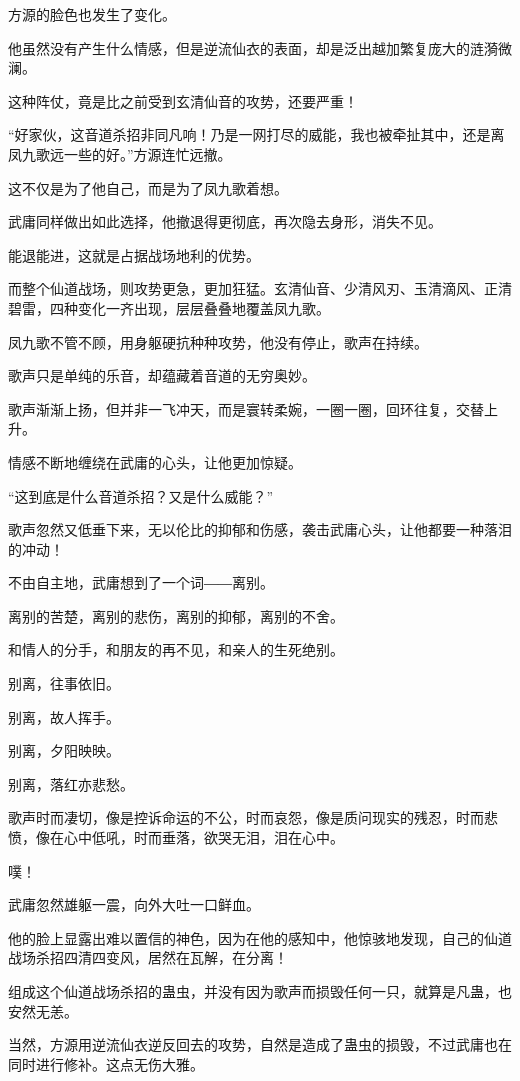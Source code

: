 \begin{this_body}
方源的脸色也发生了变化。

他虽然没有产生什么情感，但是逆流仙衣的表面，却是泛出越加繁复庞大的涟漪微澜。

这种阵仗，竟是比之前受到玄清仙音的攻势，还要严重！

“好家伙，这音道杀招非同凡响！乃是一网打尽的威能，我也被牵扯其中，还是离凤九歌远一些的好。”方源连忙远撤。

这不仅是为了他自己，而是为了凤九歌着想。

武庸同样做出如此选择，他撤退得更彻底，再次隐去身形，消失不见。

能退能进，这就是占据战场地利的优势。

而整个仙道战场，则攻势更急，更加狂猛。玄清仙音、少清风刃、玉清滴风、正清碧雷，四种变化一齐出现，层层叠叠地覆盖凤九歌。

凤九歌不管不顾，用身躯硬抗种种攻势，他没有停止，歌声在持续。

歌声只是单纯的乐音，却蕴藏着音道的无穷奥妙。

歌声渐渐上扬，但并非一飞冲天，而是寰转柔婉，一圈一圈，回环往复，交替上升。

情感不断地缠绕在武庸的心头，让他更加惊疑。

“这到底是什么音道杀招？又是什么威能？”

歌声忽然又低垂下来，无以伦比的抑郁和伤感，袭击武庸心头，让他都要一种落泪的冲动！

不由自主地，武庸想到了一个词――离别。

离别的苦楚，离别的悲伤，离别的抑郁，离别的不舍。

和情人的分手，和朋友的再不见，和亲人的生死绝别。

别离，往事依旧。

别离，故人挥手。

别离，夕阳映映。

别离，落红亦悲愁。

歌声时而凄切，像是控诉命运的不公，时而哀怨，像是质问现实的残忍，时而悲愤，像在心中低吼，时而垂落，欲哭无泪，泪在心中。

噗！

武庸忽然雄躯一震，向外大吐一口鲜血。

他的脸上显露出难以置信的神色，因为在他的感知中，他惊骇地发现，自己的仙道战场杀招四清四变风，居然在瓦解，在分离！

组成这个仙道战场杀招的蛊虫，并没有因为歌声而损毁任何一只，就算是凡蛊，也安然无恙。

当然，方源用逆流仙衣逆反回去的攻势，自然是造成了蛊虫的损毁，不过武庸也在同时进行修补。这点无伤大雅。


\end{this_body}

